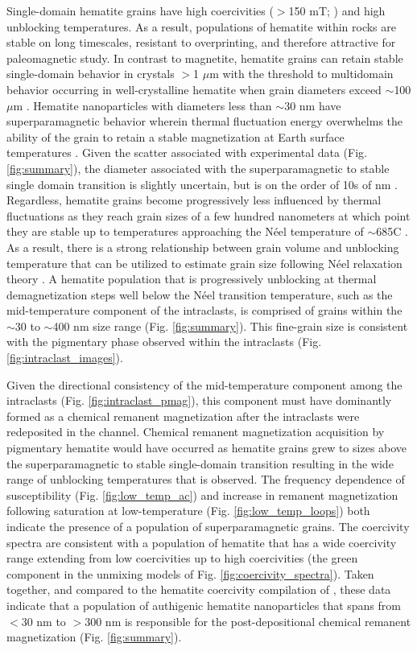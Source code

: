 \documentclass[draft]{agujournal2019}
\begin{document}
Single-domain hematite grains have high coercivities ($>$150 mT; \cite{Ozdemir2014a}) and high unblocking temperatures. As a result, populations of hematite within rocks are stable on long timescales, resistant to overprinting, and therefore attractive for paleomagnetic study. In contrast to magnetite, hematite grains can retain stable single-domain behavior in crystals $>$1 $\mu$m with the threshold to multidomain behavior occurring in well-crystalline hematite when grain diameters exceed $\sim$100 $\mu$m \cite{Kletetschka2002a, Ozdemir2014a}. Hematite nanoparticles with diameters less than $\sim$30 nm have superparamagnetic behavior wherein thermal fluctuation energy overwhelms the ability of the grain to retain a stable magnetization at Earth surface temperatures \cite{Ozdemir2014a}. Given the scatter associated with experimental data (Fig. \ref{fig:summary}), the diameter associated with the superparamagnetic to stable single domain transition is slightly uncertain, but is on the order of 10s of nm \cite{Ozdemir2014a}. Regardless, hematite grains become progressively less influenced by thermal fluctuations as they reach grain sizes of a few hundred nanometers at which point they are stable up to temperatures approaching the N\'eel temperature of $\sim$685\textdegree C \cite{Swanson-Hysell2011a, Ozdemir2014a}. As a result, there is a strong relationship between grain volume and unblocking temperature that can be utilized to estimate grain size following N\'eel relaxation theory \cite{Neel1949a, Swanson-Hysell2011a}. A hematite population that is progressively unblocking at thermal demagnetization steps well below the N\'eel transition temperature, such as the mid-temperature component of the intraclasts, is comprised of grains within the $\sim$30 to $\sim$400 nm size range (Fig. \ref{fig:summary}). This fine-grain size is consistent with the pigmentary phase observed within the intraclasts (Fig. \ref{fig:intraclast_images}). 

Given the directional consistency of the mid-temperature component among the intraclasts (Fig. \ref{fig:intraclast_pmag}), this component must have dominantly formed as a chemical remanent magnetization after the intraclasts were redeposited in the channel. Chemical remanent magnetization acquisition by pigmentary hematite would have occurred as hematite grains grew to sizes above the superparamagnetic to stable single-domain transition resulting in the wide range of unblocking temperatures that is observed. The frequency dependence of susceptibility (Fig. \ref{fig:low_temp_ac}) and increase in remanent magnetization following saturation at low-temperature (Fig. \ref{fig:low_temp_loops}) both indicate the presence of a population of superparamagnetic grains. The coercivity spectra are consistent with a population of hematite that has a wide coercivity range extending from low coercivities up to high coercivities (the green component in the unmixing models of Fig. \ref{fig:coercivity_spectra}). Taken together, and compared to the hematite coercivity compilation of \cite{Ozdemir2014a}, these data indicate that a population of authigenic hematite nanoparticles that spans from $<$30 nm to $>$300 nm is responsible for the post-depositional chemical remanent magnetization (Fig. \ref{fig:summary}). 
\end{document}
